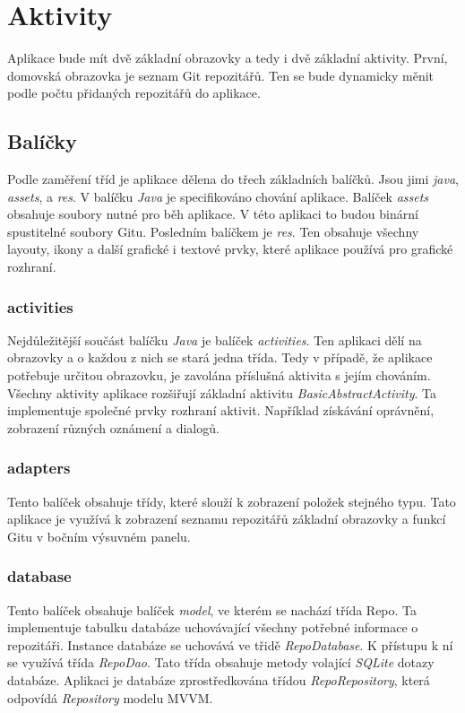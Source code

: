    \section{Aktivity}
    Aplikace bude mít dvě základní obrazovky a tedy i dvě základní aktivity. První, domovská obrazovka je seznam Git repozitářů. Ten se bude dynamicky měnit podle počtu přidaných repozitářů do aplikace.

    \subsection{Balíčky}
    Podle zaměření tříd je aplikace dělena do třech základních balíčků. Jsou jimi \emph{java}, \emph{assets}, a \emph{res}. V balíčku \emph{Java} je specifikováno chování aplikace. Balíček \emph{assets} obsahuje soubory nutné pro běh aplikace. V této aplikaci to budou binární spustitelné soubory Gitu. Posledním balíčkem je \emph{res}. Ten obsahuje všechny layouty, ikony a další grafické i textové prvky, které aplikace používá pro grafické rozhraní.

        \subsubsection{activities}
        Nejdůležitější součást balíčku \emph{Java} je balíček \emph{activities}. Ten aplikaci dělí na obrazovky a o každou z nich se stará jedna třída. Tedy v případě, že aplikace potřebuje určitou obrazovku, je zavolána příslušná aktivita s jejím chováním. Všechny aktivity aplikace rozšiřují základní aktivitu \emph{BasicAbstractActivity}. Ta implementuje společné prvky rozhraní aktivit. Například získávání oprávnění, zobrazení různých oznámení a dialogů.

        \subsubsection{adapters}
        Tento balíček obsahuje třídy, které slouží k zobrazení položek stejného typu. Tato aplikace je využívá k zobrazení seznamu repozitářů základní obrazovky a funkcí Gitu v bočním výsuvném panelu.  

        \subsubsection{database}
        Tento balíček obsahuje balíček \emph{model}, ve kterém se nachází třída Repo. Ta implementuje tabulku databáze uchovávající všechny potřebné informace o repozitáři. Instance databáze se uchovává ve třidě \emph{RepoDatabase}. K přístupu k ní se využívá třída \emph{RepoDao}. Tato třída obsahuje metody volající \emph{SQLite} dotazy databáze. Aplikaci je databáze zprostředkována třídou \emph{RepoRepository}, která odpovídá \emph{Repository} modelu MVVM.

